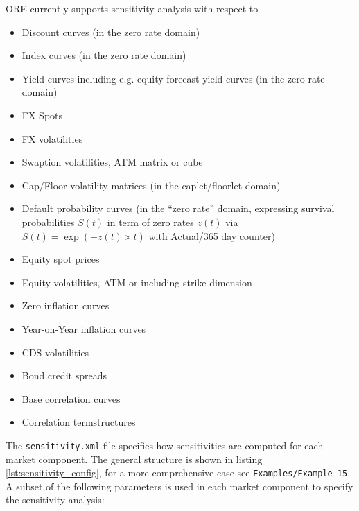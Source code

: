 \documentclass[12pt, a4paper]{article}
\begin{document}
{{ORE currently supports sensitivity analysis with respect to
\begin{itemize}
\item Discount curves  (in the zero rate domain)
\item Index curves (in the zero rate domain)
\item Yield curves including e.g. equity forecast yield curves (in the zero rate domain)
\item FX Spots
\item FX volatilities
\item Swaption volatilities, ATM matrix or cube 
\item Cap/Floor volatility matrices (in the caplet/floorlet domain)
\item Default probability curves (in the ``zero rate'' domain, expressing survival probabilities $S(t)$ in term of zero rates $z(t)$ via $S(t)=\exp(-z(t)\times t)$ with Actual/365 day counter)
\item Equity spot prices
\item Equity volatilities, ATM or including strike dimension 
\item Zero inflation curves
\item Year-on-Year inflation curves
\item CDS volatilities
\item Bond credit spreads
\item Base correlation curves
\item Correlation termstructures
\end{itemize}

The {\tt sensitivity.xml} file specifies how sensitivities are computed for each market component. 
The general structure is shown in listing \ref{lst:sensitivity_config}, for a more comprehensive case see {\tt Examples/Example\_15}. A subset of the following parameters is used in each market component to specify the sensitivity analysis:

}}
\end{document}
